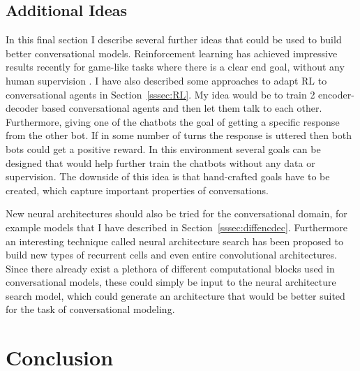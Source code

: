 \documentclass[12pt]{article}
\begin{document}
\subsection{Additional Ideas} \label{ssec:63}
In this final section I describe several further ideas that could be used to build better conversational models. Reinforcement learning has achieved impressive results recently for game-like tasks where there is a clear end goal, without any human supervision \cite{alphagozero}. I have also described some approaches to adapt RL to conversational agents in Section~\ref{sssec:RL}. My idea would be to train 2 encoder-decoder based conversational agents and then let them talk to each other. Furthermore, giving one of the chatbots the goal of getting a specific response from the other bot. If in some number of turns the response is uttered then both bots could get a positive reward. In this environment several goals can be designed that would help further train the chatbots without any data or supervision. The downside of this idea is that hand-crafted goals have to be created, which capture important properties of conversations.

New neural architectures should also be tried for the conversational domain, for example models that I have described in Section~\ref{sssec:diffencdec}. Furthermore an interesting technique called neural architecture search \cite{Zoph:2016} has been proposed to build new types of recurrent cells and even entire convolutional architectures. Since there already exist a plethora of different computational blocks used in conversational models, these could simply be input to the neural architecture search model, which could generate an architecture that would be better suited for the task of conversational modeling.




\newpage\section{Conclusion} \label{sec:conclusion}
\end{document}
